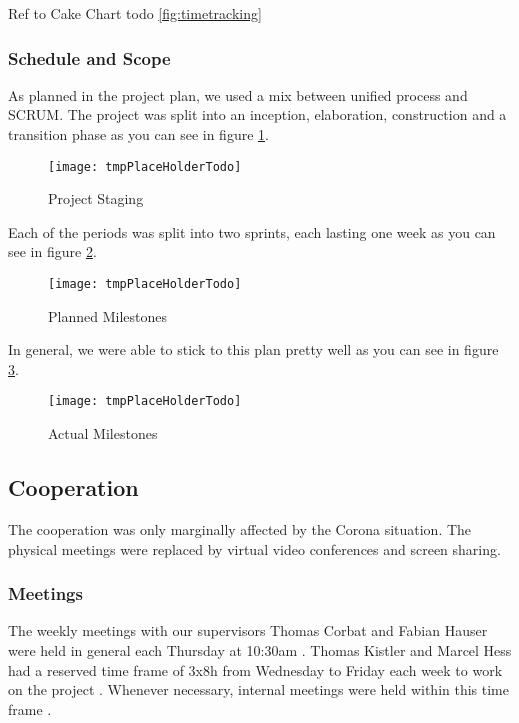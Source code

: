 Ref to Cake Chart todo \ref{fig:timetracking}

\subsubsection{Schedule and Scope}
As planned in the project plan, we used a mix between unified process and SCRUM.
The project was split into an inception, elaboration, construction and a transition phase
as you can see in figure \ref{fig:project_staging}.

\begin{figure}[H]
    \centering
    \texttt{[image: tmpPlaceHolderTodo]}
    \caption{Project Staging}
    \label{fig:project_staging}
\end{figure}

Each of the periods was split into two sprints, each lasting one week
as you can see in figure \ref{fig:planned_milestones}.

\begin{figure}[H]
    \centering
    \texttt{[image: tmpPlaceHolderTodo]}
    \caption{Planned Milestones}
    \label{fig:planned_milestones}
\end{figure}

In general, we were able to stick to this plan pretty well as you can see in figure \ref{fig:actual_milestones}.

\begin{figure}[H]
    \centering
    \texttt{[image: tmpPlaceHolderTodo]}
    \caption{Actual Milestones}
    \label{fig:actual_milestones}
\end{figure}

\subsection{Cooperation}
The cooperation was only marginally affected by the Corona situation.
The physical meetings were replaced by virtual video conferences and screen sharing.

\subsubsection{Meetings}
The weekly meetings with our supervisors Thomas Corbat and Fabian Hauser were held in general each Thursday at 10:30am \cite{projectplan}.
Thomas Kistler and Marcel Hess had a reserved time frame of 3x8h from Wednesday to
Friday each week to work on the project \cite{projectplan}.
Whenever necessary, internal meetings were held within this time frame \cite{projectplan}.

